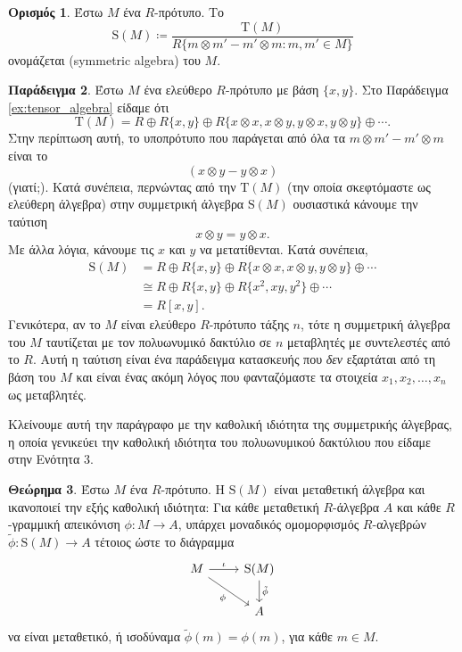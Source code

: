 \documentclass[12pt,a4paper,reqno]{amsart}
\theoremstyle{definition}
\newtheorem{theorem}{Θεώρημα}
\newtheorem{definition}[theorem]{Ορισμός}
\newtheorem{example}[theorem]{Παράδειγμα}
\theoremstyle{remark}
\numberwithin{theorem}{section}
\numberwithin{exercise}{section}
\numberwithin{equation}{section}
\newcommand{\rmS}{\mathrm{S}}
\newcommand{\rmT}{\mathrm{T}}
\renewcommand{\to}{\rightarrow}
\newcommand{\defn}[1]{{\color{mylightblue}{#1}}}
\begin{document}
\begin{definition}
    \label{def:symmetric_algebra}
    Έστω $M$ ένα $R$-πρότυπο. Το 
    \[
    \rmS(M) \coloneqq \frac{\rmT(M)}{R\{m \otimes m' - m' \otimes m : m, m' \in M\}}
    \]
    ονομάζεται \defn{συμμετρική άλγεβρα} (symmetric algebra) του $M$.
\end{definition}

\begin{example}
    \label{ex:symmetric_algebra}
    Έστω $M$ ένα ελεύθερο $R$-πρότυπο με βάση $\{x, y\}$. Στο Παράδειγμα \ref{ex:tensor_algebra} είδαμε ότι 
    \[
    \rmT(M) = R \oplus R\{x, y\} \oplus R\{x\otimes x, x\otimes y, y \otimes x, y \otimes y\} \oplus \cdots. 
    \]
    Στην περίπτωση αυτή, το υποπρότυπο που παράγεται από όλα τα $m \otimes m' - m' \otimes m$ είναι το 
    \[
    (x \otimes y - y \otimes x)
    \]
    (γιατί;). Κατά συνέπεια, περνώντας από την $\rmT(M)$ (την οποία σκεφτόμαστε ως ελεύθερη άλγεβρα) στην συμμετρική άλγεβρα $\rmS(M)$ ουσιαστικά κάνουμε την ταύτιση 
    \[
    x \otimes y = y \otimes x.
    \]
    Με άλλα λόγια, κάνουμε τις  $x$ και $y$ να μετατίθενται. Κατά συνέπεια, 
    \begin{align*}
    \rmS(M) &= R \oplus R\{x, y\} \oplus R\{x\otimes x, x \otimes y, y \otimes y\} \oplus \cdots \\
    &\cong R \oplus R\{x,y\} \oplus R\{x^2, xy, y^2\} \oplus \cdots \\ 
    &= R[x,y]. 
    \end{align*}
    Γενικότερα, αν το $M$ είναι ελεύθερο $R$-πρότυπο τάξης $n$, τότε η συμμετρική άλγεβρα του $M$ ταυτίζεται με τον πολυωνυμικό δακτύλιο σε $n$ μεταβλητές με συντελεστές από το $R$. Αυτή η ταύτιση είναι ένα παράδειγμα κατασκευής που \emph{δεν} εξαρτάται από τη βάση του $M$ και είναι ένας ακόμη λόγος που φανταζόμαστε τα στοιχεία $x_1, x_2, \dots, x_n$ ως μεταβλητές.
\end{example}

Κλείνουμε αυτή την παράγραφο με την καθολική ιδιότητα της συμμετρικής άλγεβρας, η οποία γενικεύει την καθολική ιδιότητα του πολυωνυμικού δακτύλιου που είδαμε στην Ενότητα 3.

\begin{theorem}
    \label{thm:symmetric_algebra}
    Έστω $M$ ένα $R$-πρότυπο. Η $\rmS(M)$ είναι μεταθετική άλγεβρα και ικανοποιεί την εξής καθολική ιδιότητα: Για κάθε μεταθετική $R$-άλγεβρα $A$ και κάθε $R$-γραμμική απεικό\-νιση $\phi : M \to A$, υπάρχει μοναδικός ομομορφισμός $R$-αλγεβρών $\tilde{\phi} : \rmS(M) \to A$ τέτοιος ώστε το διάγραμμα 
    \[
    \begin{tikzcd}
    M \arrow[r, "\iota"] \arrow[dr, "\phi"'] & \rmS(M) \arrow[d, "\tilde{\phi}"] \\
                                        & A
    \end{tikzcd}
    \]
    να είναι μεταθετικό, ή ισοδύναμα $\tilde{\phi}(m) = \phi(m)$, για κάθε $m \in M$.
\end{theorem}
\end{document}
